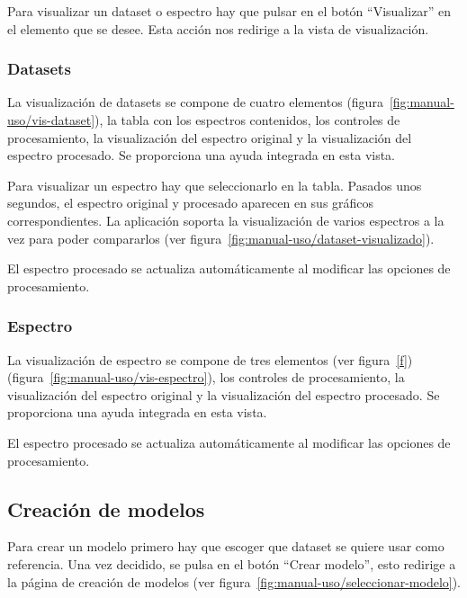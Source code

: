 Para visualizar un dataset o espectro hay que pulsar en el botón ``Visualizar'' 
en el elemento que se desee. Esta acción nos redirige a la vista de 
visualización.

\subsubsection{Datasets}

La visualización de datasets se compone de cuatro elementos 
(figura~\ref{fig:manual-uso/vis-dataset}), la tabla con los espectros 
contenidos, los controles de procesamiento, la visualización del 
espectro original y la visualización del espectro procesado. Se proporciona una 
ayuda integrada en esta vista.


Para visualizar un espectro hay que seleccionarlo en la tabla. Pasados unos 
segundos, el espectro original y procesado aparecen en sus gráficos 
correspondientes. La aplicación soporta la visualización de varios espectros a 
la vez para poder compararlos (ver 
figura~\ref{fig:manual-uso/dataset-visualizado}).


El espectro procesado se actualiza automáticamente al modificar las opciones de 
procesamiento.

\subsubsection{Espectro}

La visualización de espectro se compone de tres elementos (ver figura~\ref{f})
(figura~\ref{fig:manual-uso/vis-espectro}), los controles de procesamiento, la 
visualización del espectro original y la visualización del espectro procesado. 
Se proporciona una ayuda integrada en esta vista.


El espectro procesado se actualiza automáticamente al modificar las opciones de 
procesamiento.

\subsection{Creación de modelos}

Para crear un modelo primero hay que escoger que dataset se quiere usar como 
referencia. Una vez decidido, se pulsa en el botón ``Crear modelo'', esto 
redirige a la página de creación de modelos (ver 
figura~\ref{fig:manual-uso/seleccionar-modelo}). 

